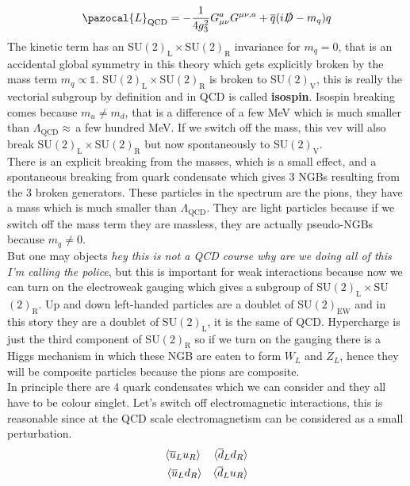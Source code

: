 \documentclass[../main.tex]{subfiles}
\begin{document}
\[
\pazocal{L}_{\text{QCD}}=-\frac{1}{4g_3^2}G_{\mu\nu}^aG^{\mu\nu,a}+\overline{q}(i\slashed{D}-m_q)q
\]
The kinetic term has an SU$(2)_{\text{L}}\times$SU$(2)_{\text{R}}$ invariance for $m_q=0$, that is an accidental global symmetry in this theory which gets explicitly broken by the mass term $m_q\propto\mathbb{1}$. SU$(2)_{\text{L}}\times$SU$(2)_{\text{R}}$ is broken to SU$(2)_{\text{V}}$, this is really the vectorial subgroup by definition and in QCD is called \textbf{isospin}. Isospin breaking comes because $m_u\neq m_d$, that is a difference of a few MeV which is much smaller than $\Lambda_{\text{QCD}}\approx$\,a few hundred MeV. If we switch off the mass, this vev will also break SU$(2)_{\text{L}}\times$SU$(2)_{\text{R}}$ but now spontaneously to SU$(2)_{\text{V}}$.\\
There is an explicit breaking from the masses, which is a small effect, and a spontaneous breaking from quark condensate which gives 3 NGBs resulting from the 3 broken generators. These particles in the spectrum are the pions, they have a mass which is much smaller than $\Lambda_{\text{QCD}}$. They are light particles because if we switch off the mass term they are massless, they are actually pseudo-NGBs because $m_q\neq0$.\\
But one may objects \textit{hey this is not a QCD course why are we doing all of this I'm calling the police}, but this is important for weak interactions because now we can turn on the electroweak gauging which gives a subgroup of SU$(2)_{\text{L}}\times$SU$(2)_{\text{R}}$. Up and down left-handed particles are a doublet of SU$(2)_{\text{EW}}$ and in this story they are a doublet of SU$(2)_{\text{L}}$, it is the same of QCD. Hypercharge is just the third component of SU$(2)_{\text{R}}$ so if we turn on the gauging there is a Higgs mechanism in which these NGB are eaten to form $W_L$ and $Z_L$, hence they will be composite particles because the pions are composite.\\
In principle there are 4 quark condensates which we can consider and they all have to be colour singlet. Let's switch off electromagnetic interactions, this is reasonable since at the QCD scale electromagnetism can be considered as a small perturbation. 
\[
\begin{aligned}
    &\langle\overline{u}_Lu_R\rangle &\langle\overline{d}_Ld_R\rangle\\
    &\Braket{\overline{u}_Ld_R} &\langle\overline{d}_Lu_R\rangle
\end{aligned}
\]
\end{document}
